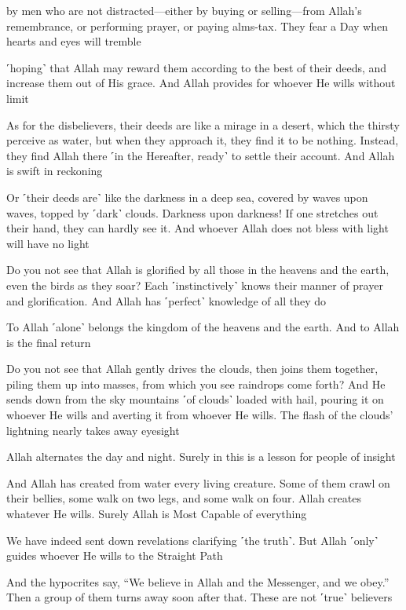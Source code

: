 by men who are not distracted—either by buying or selling—from Allah’s remembrance, or performing prayer, or paying alms-tax. They fear a Day when hearts and eyes will tremble

˹hoping˺ that Allah may reward them according to the best of their deeds, and increase them out of His grace. And Allah provides for whoever He wills without limit

As for the disbelievers, their deeds are like a mirage in a desert, which the thirsty perceive as water, but when they approach it, they find it to be nothing. Instead, they find Allah there ˹in the Hereafter, ready˺ to settle their account. And Allah is swift in reckoning

Or ˹their deeds are˺ like the darkness in a deep sea, covered by waves upon waves, topped by ˹dark˺ clouds. Darkness upon darkness! If one stretches out their hand, they can hardly see it. And whoever Allah does not bless with light will have no light

Do you not see that Allah is glorified by all those in the heavens and the earth, even the birds as they soar? Each ˹instinctively˺ knows their manner of prayer and glorification. And Allah has ˹perfect˺ knowledge of all they do

To Allah ˹alone˺ belongs the kingdom of the heavens and the earth. And to Allah is the final return

Do you not see that Allah gently drives the clouds, then joins them together, piling them up into masses, from which you see raindrops come forth? And He sends down from the sky mountains ˹of clouds˺ loaded with hail, pouring it on whoever He wills and averting it from whoever He wills. The flash of the clouds’ lightning nearly takes away eyesight

Allah alternates the day and night. Surely in this is a lesson for people of insight

And Allah has created from water every living creature. Some of them crawl on their bellies, some walk on two legs, and some walk on four. Allah creates whatever He wills. Surely Allah is Most Capable of everything

We have indeed sent down revelations clarifying ˹the truth˺. But Allah ˹only˺ guides whoever He wills to the Straight Path

And the hypocrites say, “We believe in Allah and the Messenger, and we obey.” Then a group of them turns away soon after that. These are not ˹true˺ believers

